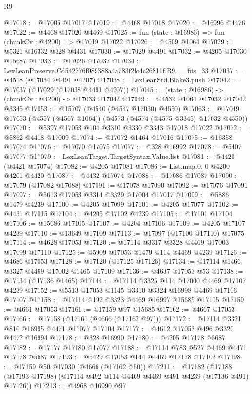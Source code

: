\begin{lexlean}{R9}
\begin{coremodule}
@17018 := @17005 @17017
@17019 := @4468 @17018
@17020 := @16996 @4476
@17022 := @4468 @17020 @4469
@17025 := fun (state : @16986) => fun (chunkCv : @4200) => @17019 @17022
@17026 := @4509 @1064
@17029 := @5321 @16332 @328 @4431
@17030 := @17029 @4491
@17032 := @4205 @17030 @15687
@17033 := @17026 @17032
@17034 := LexLeanPreserve.Cd542376f089388a4a783f2fc4c26811f.R9.__fits_33
@17037 := @4518 (@17034 @4491 @4207)
@17038 := LexLeanStd.Blake3.push
@17042 := @17037 (@17029 (@17038 @4491 @4207))
@17045 := (state : @16986) -> (chunkCv : @4200) -> @17033 @17042
@17049 := @4532 @1064 @17032 @17042 @3345
@17053 := @15707 (@4540 (@4547 @17030) @4550)
@17063 := @17049 @17053 (@4557 (@4567 @1064)) (@4573 (@4574 (@4575 @3345) @17032 @4550))
@17070 := @5397 @17053 @104 @3310 @3330 @3343 @17018 @17022
@17072 := @5862 @4418 @17009
@17074 := @17072 @1464 @17016
@17075 := @16358 @17074
@17076 := @17070 @17075
@17077 := @328 @16992
@17078 := @5407 @17077
@17079 := LexLeanTarget.TargetSyntax.Value.list
@17081 := @4420 (@4421 @17074)
@17082 := @4205 @17081
@17086 := List.map.{0, 0} @4200 @4201 @4420
@17087 := @4432 @17074
@17088 := @17086 @17087
@17090 := @17079 (@17082 @17088)
@17091 := @17078 @17090
@17092 := @17076 @17091
@17097 := @5613 @17053 @3314 @3329 @17004 @17017
@17099 := @5886 @1479 @4239
@17100 := @4205 @17099
@17101 := @4205 @17077
@17102 := @4431 @17015
@17104 := @4205 @17102 @4239
@17105 := @17101 @17104
@17106 := @15686 @17105
@17107 := @4204 @17106
@17109 := @4205 @17107 @4239
@17110 := @13649 @17109
@17113 := @17097 (@17100 @17110) @17075
@17114 := @4628 @17053
@17120 := @17114 @3317 @3328 @4469 @17003 @17099 @17110
@17125 := @5909 @17053 @1479 @114 @4469 @4239
@17126 := @4686 @17053
@17128 := @17120 (@17125 @17126)
@17134 := @17114 @1466 @3327 @4469 @17002 @1465 @17109
@17136 := @4637 @17053 @53
@17138 := @17134 (@17136 @1465)
@17144 := @17114 @3325 @114 @17000 @4469 @17107 @4239
@17152 := @5513 @17053 @1145 @3310 @3324 @16998 @4469 @17106 @17107
@17158 := @17114 @192 @3323 @4469 @16997 @15685 @17105
@17159 := @4661 @17053
@17161 := @17159 @97 @15685
@17162 := @4667 @17053
@17166 := @17158 (@17161 (@4666 (@17162 @97)))
@17172 := @17114 @3321 @810 @16995 @4471 @17077 @17104
@17177 := @4612 @17053 @496 @3320 @4472 @16994
@17178 := @328 @16990
@17180 := @4205 @17178 @5687
@17182 := @17177 @17180 @17077
@17188 := @17114 @783 @527 @4469 @4471 @17178 @5687
@17193 := @5429 @17053 @144 @4469 @17178 @17102
@17198 := @17159 @50 @17030 (@4666 (@17162 @50))
@17211 := @17182
    (@17188 (@17193 @17198) (@17114 @492 @114 @4469 @4469 @491 @4239 (@17136 @491) @17126))
@17213 := @4968 @16990 @97

\end{coremodule}
\end{lexlean}
